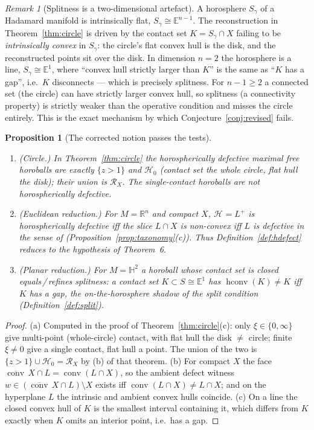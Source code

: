 \documentclass[11pt]{article}
\newtheorem{proposition}[theorem]{Proposition}
\theoremstyle{remark}
\newtheorem{remark}[theorem]{Remark}
\newcommand{\R}{\mathbb{R}}
\newcommand{\X}{X}
\newcommand{\Rx}{\mathcal{R}_{\X}}
\newcommand{\Hb}[1]{\mathcal{H}_{#1}}
\newcommand{\Sb}[1]{S_{#1}}
\newcommand{\conv}{\operatorname{conv}}
\newcommand{\cconv}[1]{\overline{\conv}\,#1}
\begin{document}
\begin{remark}[Splitness is a two-dimensional artefact]
\label{rem:artefact}
A horosphere $S_{\gamma}$ of a Hadamard manifold is intrinsically
flat, $S_{\gamma}\cong\mathbb{E}^{n-1}$. The reconstruction in
Theorem~\ref{thm:circle} is driven by the contact set $K=S_{\gamma}
\cap\X$ failing to be \emph{intrinsically convex} in $S_{\gamma}$:
the circle's flat convex hull is the disk, and the reconstructed
points sit over the disk. In dimension $n=2$ the horosphere is a
line, $S_{\gamma}\cong\mathbb{E}^{1}$, where ``convex hull strictly
larger than $K$'' is the same as ``$K$ has a gap'', i.e.\ $K$
disconnects --- which is precisely splitness. For $n-1\ge2$ a
connected set (the circle) can have strictly larger convex hull, so
splitness (a connectivity property) is strictly weaker than the
operative condition and misses the circle entirely. This is the
exact mechanism by which Conjecture~\ref{conj:revised} fails.
\end{remark}

\begin{proposition}[The corrected notion passes the tests]
\label{prop:hdefect}
\leavevmode
\begin{enumerate}[label=(\alph*)]
\item \emph{(Circle.)} In Theorem~\ref{thm:circle} the horospherically
defective maximal free horoballs are exactly $\{z>1\}$ and
$\mathcal{H}_{0}$ (contact set the whole circle, flat hull the disk);
their union is $\Rx$. The single-contact horoballs are not
horospherically defective.
\item \emph{(Euclidean reduction.)} For $M=\R^{n}$ and compact $\X$,
$\Hb{}=L^{+}$ is horospherically defective iff the slice
$L\cap\X$ is non-convex iff $L$ is defective in the sense of
\cite{Bia} (Proposition~\ref{prop:taxonomy}(c)). Thus
Definition~\ref{def:hdefect} reduces to the hypothesis of Theorem~6.
\item \emph{(Planar reduction.)} For $M=\mathbb{H}^{2}$ a horoball
whose contact set is closed equals\,/\,refines splitness: a contact
set $K\subset\Sb{}\cong\mathbb{E}^{1}$ has
$\operatorname{hconv}(K)\neq K$ iff $K$ has a gap, the
on-the-horosphere shadow of the split condition
(Definition~\ref{def:split}).
\end{enumerate}
\end{proposition}

\begin{proof}
(a) Computed in the proof of Theorem~\ref{thm:circle}(c): only
$\xi\in\{0,\infty\}$ give multi-point (whole-circle) contact, with
flat hull the disk $\neq$ circle; finite $\xi\neq0$ give a single
contact, flat hull a point. The union of the two is
$\{z>1\}\cup\mathcal{H}_{0}=\Rx$ by (b) of that theorem.
(b) For compact $\X$ the face
$\cconv\X\cap L=\conv(L\cap\X)$, so the ambient defect witness
$w\in(\cconv\X\cap L)\setminus\X$ exists iff $\conv(L\cap\X)\neq
L\cap\X$; and on the hyperplane $L$ the intrinsic and ambient convex
hulls coincide. (c) On a line the closed convex hull of $K$ is the
smallest interval containing it, which differs from $K$ exactly when
$K$ omits an interior point, i.e.\ has a gap.
\end{proof}
\end{document}
